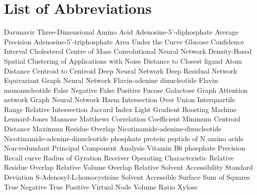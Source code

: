 \chapter*{List of Abbreviations}

\begin{acronym}[LightGBM] %

 {Darunavir}
 {Three-Dimensional}
 {Amino Acid}
 {Adenosine-5'-diphosphate}
 {Average Precision}
 {Adenosine-5’-triphosphate}
 {Area Under the Curve}
 {Glucose}
 {Confidence Interval}
 {Cholesterol}
 {Centre of Mass}
 {Convolutional Neural Network}
 {Density-Based Spatial Clustering of Applications with Noise}
 {Distance to Closest ligand Atom}
 {Distance Centroid to Centroid}
 {Deep Neural Network}
 {Deep Residual Network}
 {Equivariant Graph Neural Network}
 {Flavin-adenine dinucleotide}
 {Flavin mononucleotide}
 {False Negative}
 {False Positive}
 {Fucose}
 {Galactose}
 {Graph Attention network}
 {Graph Neural Network}
 {Haem}
 {Intersection Over Union}
 {Interquartile Range}
 {Relative Intersection}
 {Jaccard Index}
 {Light Gradient Boosting Machine}
 {Lennard-Jones}
 {Mannose}
 {Matthews Correlation Coefficient}
 {Minimum Centroid Distance}
 {Maximum Residue Overlap}
 {Nicotinamide-adenine-dinucleotide}
 {Nicotinamide-adenine-dinucleotide phosphate}
 {protein peptide of N amino acids}
 {Non-redundant}
 {Principal Component Analysis}
 {Vitamin B6 phosphate}
 {Precision Recall curve}
 {Radius of Gyration}
 {Receiver Operating Characteristic}
 {Relative Residue Overlap}
 {Relative Volume Overlap}
 {Relative Solvent Accessibility}
 {Standard Deviation}
 {S-Adenosyl-L-homocysteine}
 {Solvent Accessible Surface}
 {Sum of Squares}
 {True Negative}
 {True Positive}
 {Virtual Node}
 {Volume Ratio}
 {Xylose}


\end{acronym}